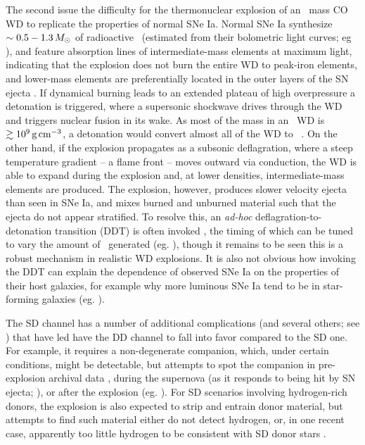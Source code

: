 The second issue the difficulty for the thermonuclear explosion of an \Mch\ mass CO WD to replicate the properties of normal SNe Ia.  Normal SNe Ia synthesize $\sim0.5 - 1.3\,\Msun$ of radioactive \Ni\ (estimated from their bolometric light curves; eg \citealt{stri+06}), and feature absorption lines of intermediate-mass elements at maximum light, indicating that the explosion does not burn the entire WD to peak-iron elements, and lower-mass elements are preferentially located in the outer layers of the SN ejecta \citep{howe11, hill+13}.  If dynamical burning leads to an extended plateau of high overpressure a detonation \citep{seit+09} is triggered, where a supersonic shockwave drives through the WD and triggers nuclear fusion in its wake.  As most of the mass in an \Mch\ WD is $\gtrsim10^9\,\gcc$, a detonation would convert almost all of the WD to \Ni\ \citep{howe11, hill+13}.  On the other hand, if the explosion propagates as a subsonic deflagration, where a steep temperature gradient -- a flame front -- moves outward via conduction, the WD is able to expand during the explosion and, at lower densities, intermediate-mass elements are produced.  The explosion, however, produces slower velocity ejecta than seen in SNe Ia, and mixes burned and unburned material such that the ejecta do not appear stratified.  To resolve this, an \textit{ad-hoc} deflagration-to-detonation transition (DDT) is often invoked \citep{khok91}, the timing of which can be tuned to vary the amount of \Ni\ generated (eg. \citealt{hill+13}), though it remains to be seen this is a robust mechanism in realistic WD explosions.  It is also not obvious how invoking the DDT can explain the dependence of observed SNe Ia on the properties of their host galaxies, for example why more luminous SNe Ia tend to be in star-forming galaxies (eg. \citealt{hamu+00, howe+09, sull+10}).

The SD channel has a number of additional complications (and several others; see \citealt{maozns14}) that have led have the DD channel to fall into favor compared to the SD one.  For example, it requires a non-degenerate companion, which, under certain conditions, might be detectable, but attempts to spot the companion in pre-explosion archival data \citep{li+11cpn, nielvn13, niel+14}, during the supernova (as it responds to being hit by SN ejecta; \citealt{bloo+12,ollms15}), or after the explosion (eg. \citealt{kerz+14rem}).  For SD scenarios involving hydrogen-rich donors, the explosion is also expected to strip and entrain donor material, but attempts to find such material either do not detect hydrogen, or, in one recent case, apparently too little hydrogen to be consistent with SD donor stars \citep{magu+16}.  

